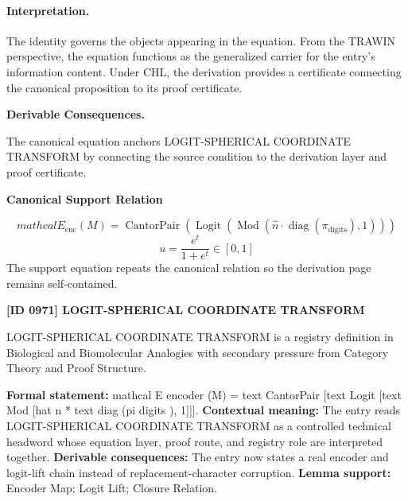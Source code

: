 \paragraph{Interpretation.}
The identity governs the objects appearing in the equation. From the TRAWIN perspective, the equation functions as the generalized carrier for the entry’s information content. Under CHL, the derivation provides a certificate connecting the canonical proposition to its proof certificate.

\par\vspace{0.35em}
\noindent\textbf{Derivable Consequences.}\quad
\begingroup
\footnotesize
\raggedright
The canonical equation anchors LOGIT-SPHERICAL COORDINATE TRANSFORM by connecting the source condition to the derivation layer and proof certificate.
\par\endgroup

\noindent\textbf{Canonical Support Relation}\par
\[
mathcal{E}_{\mathrm{enc}}(M)=\operatorname{CantorPair}\!\left(\operatorname{Logit}\!\left(\operatorname{Mod}\!\left(\widehat{n}\cdot \operatorname{diag}(\pi_{\mathrm{digits}}),1\right)\right)\right)
\]
\[
u=\frac{e^{t}}{1+e^{t}}\in[0,1]
\]
\noindent The support equation repeats the canonical relation so the derivation page remains self-contained.\par

\clearpage
\noindent\textbf{[ID 0971] LOGIT-SPHERICAL COORDINATE TRANSFORM}\par
\vspace{0.35em}
\begingroup\small
{}
LOGIT-SPHERICAL COORDINATE TRANSFORM is a registry definition in Biological and Biomolecular Analogies with secondary pressure from Category Theory and Proof Structure.

\begingroup\footnotesize\setlength{\emergencystretch}{3em}\sloppy
\textbf{Formal statement:} mathcal E encoder (M) = text CantorPair [text Logit [text Mod [hat n * text diag (pi digits ), 1]]]. \textbf{Contextual meaning:} The entry reads LOGIT-SPHERICAL COORDINATE TRANSFORM as a controlled technical headword whose equation layer, proof route, and registry role are interpreted together. \textbf{Derivable consequences:} The entry now states a real encoder and logit-lift chain instead of replacement-character corruption. \textbf{Lemma support:} Encoder Map; Logit Lift; Closure Relation.\par
\endgroup

